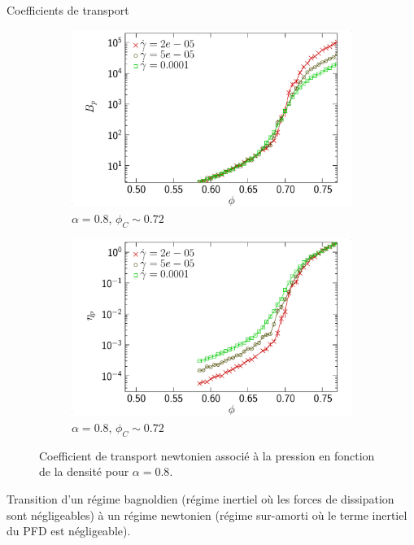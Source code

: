 \documentclass{beamer}
\begin{document}
\begin{frame}{Coefficients de transport}

\begin{figure}[h!]
\centering
    \begin{subfigure}[t]{0.49\textwidth}
        \centering
        \includegraphics[width=\textwidth]{figures/figs/bp_0064_KDk500_Ml100_EL080}
        \caption{$\alpha=0.8$, $\phi_C\sim0.72$}
        \label{bp_0064_KDk500_Ml100_EL080}
    \end{subfigure}
    \hfill
     \begin{subfigure}[t]{0.49\textwidth}
        \centering
        \includegraphics[width=\textwidth]{figures/figs/etap_0064_KDk500_Ml100_EL080}
        \caption{$\alpha=0.8$, $\phi_C\sim0.72$}
        \label{etap_0064_KDk500_Ml100_EL080}
    \end{subfigure}
    \caption{Coefficient de transport newtonien associé à la pression en fonction de la densité pour $\alpha=0.8$.}
\end{figure}
\vspace{-10pt}
Transition d’un régime bagnoldien (régime inertiel où les forces de dissipation sont négligeables) à un régime newtonien (régime sur-amorti où le terme inertiel du PFD est négligeable).

\end{frame}
\end{document}

